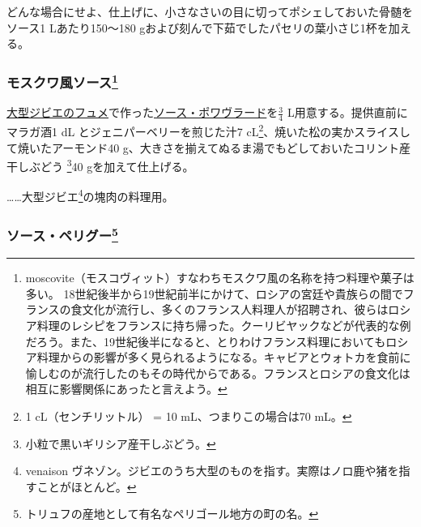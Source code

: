 \begin{recette}
どんな場合にせよ、仕上げに、小さなさいの目に切ってポシェしておいた骨髄をソース1
Lあたり150〜180 gおよび刻んで下茹でしたパセリの葉小さじ1杯を加える。

\hypertarget{sauce-moscovite}{%
\subsubsection[モスクワ風ソース]{\texorpdfstring{モスクワ風ソース\footnote{moscovite（モスコヴィット）すなわちモスクワ風の名称を持つ料理や菓子は多い。
  18世紀後半から19世紀前半にかけて、ロシアの宮廷や貴族らの間でフランスの食文化が流行し、多くのフランス人料理人が招聘され、彼らはロシア料理のレシピをフランスに持ち帰った。クーリビヤックなどが代表的な例だろう。また、19世紀後半になると、とりわけフランス料理においてもロシア料理からの影響が多く見られるようになる。キャビアとウォトカを食前に愉しむのが流行したのもその時代からである。フランスとロシアの食文化は相互に影響関係にあったと言えよう。}}{モスクワ風ソース}}\label{sauce-moscovite}}



\protect\hyperlink{fonds-de-gibier}{大型ジビエのフュメ}で作った\protect\hyperlink{sauce-poivrade}{ソース・ポワヴラード}を\(\frac{3}{4}\)
L用意する。提供直前にマラガ酒1 dL とジェニパーベリーを煎じた汁7
cL\footnote{1 cL（センチリットル） = 10 mL、つまりこの場合は70 mL。}、焼いた松の実かスライスして焼いたアーモンド40
g、大きさを揃えてぬるま湯でもどしておいたコリント産干しぶどう \footnote{小粒で黒いギリシア産干しぶどう。}40
gを加えて仕上げる。

\ldots{}\ldots{}大型ジビエ\footnote{venaison
  ヴネゾン。ジビエのうち大型のものを指す。実際はノロ鹿や猪を指すことがほとんど。}の塊肉の料理用。

\hypertarget{sauce-perigueux}{%
\subsubsection[ソース・ペリグー]{\texorpdfstring{ソース・ペリグー\footnote{トリュフの産地として有名なペリゴール地方の町の名。}}{ソース・ペリグー}}\label{sauce-perigueux}}




\end{recette}

